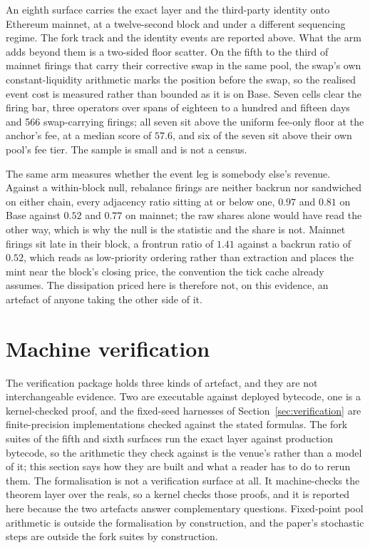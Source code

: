 \documentclass[11pt,a4paper]{article}
\theoremstyle{definition}
\theoremstyle{plain}
\theoremstyle{remark}
\begin{document}
An eighth surface carries the exact layer and the third-party identity onto Ethereum mainnet, at a twelve-second block and under a different sequencing regime. The fork track and the identity 
events are reported above. What the arm adds beyond them is a two-sided floor scatter. On the fifth to the third of mainnet firings that carry their corrective swap in the same pool, the swap's 
own constant-liquidity arithmetic marks the position before the swap, so the realised event cost is measured rather than bounded as it is on Base. Seven cells clear the firing bar, three 
operators over spans of eighteen to a hundred and fifteen days and 566 swap-carrying firings; all seven sit above the uniform fee-only floor at the anchor's fee, at a median score of $57.6$, 
and six of the seven sit above their own pool's fee tier. The sample is small and is not a census.

The same arm measures whether the event leg is somebody else's revenue. Against a within-block null, rebalance firings are neither backrun nor sandwiched on either chain, every adjacency 
ratio sitting at or below one, $0.97$ and $0.81$ on Base against $0.52$ and $0.77$ on mainnet; the raw shares alone would have read the other way, which is why the null is the statistic 
and the share is not. Mainnet firings sit late in their block, a frontrun ratio of $1.41$ against a backrun ratio of $0.52$, which reads as low-priority ordering rather than extraction 
and places the mint near the block's closing price, the convention the tick cache already assumes. The dissipation priced here is therefore not, on this evidence, an artefact of anyone 
taking the other side of it.


\section{Machine verification}\label{sec:machine}

The verification package holds three kinds of artefact, and they are not interchangeable evidence. Two are executable against deployed bytecode, one is a kernel-checked proof, and the 
fixed-seed harnesses of Section~\ref{sec:verification} are finite-precision implementations checked against the stated formulas. The fork suites of the fifth and sixth surfaces run the 
exact layer against production bytecode, so the arithmetic they check against is the venue's rather than a model of it; this section says how they are built and what a reader has to do 
to rerun them. The formalisation is not a verification surface at all. It machine-checks the theorem layer over the reals, so a kernel checks those proofs, and it is reported here because 
the two artefacts answer complementary questions. Fixed-point pool arithmetic is outside the formalisation by construction, and the paper's stochastic steps are outside the fork suites by 
construction.
\end{document}
